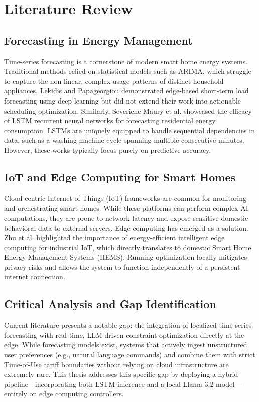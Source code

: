 \documentclass[12pt, a4paper]{article}
\begin{document}
\section{Literature Review}

\subsection{Forecasting in Energy Management}
Time-series forecasting is a cornerstone of modern smart home energy systems. Traditional methods relied on statistical models such as ARIMA, which struggle to capture the non-linear, complex usage patterns of distinct household appliances. Lekidis and Papageorgiou \cite{lekidis2023edge} demonstrated edge-based short-term load forecasting using deep learning but did not extend their work into actionable scheduling optimization. Similarly, Severiche-Maury et al. \cite{severiche2025forecasting} showcased the efficacy of LSTM recurrent neural networks for forecasting residential energy consumption. LSTMs are uniquely equipped to handle sequential dependencies in data, such as a washing machine cycle spanning multiple consecutive minutes. However, these works typically focus purely on predictive accuracy. 

\subsection{IoT and Edge Computing for Smart Homes}
Cloud-centric Internet of Things (IoT) frameworks \cite{zawish2023energy, ali2023iot} are common for monitoring and orchestrating smart homes. While these platforms can perform complex AI computations, they are prone to network latency and expose sensitive domestic behavioral data to external servers. Edge computing has emerged as a solution. Zhu et al. \cite{zhu2022green} highlighted the importance of energy-efficient intelligent edge computing for industrial IoT, which directly translates to domestic Smart Home Energy Management Systems (HEMS). Running optimization locally mitigates privacy risks and allows the system to function independently of a persistent internet connection. 

\subsection{Critical Analysis and Gap Identification}
Current literature presents a notable gap: the integration of localized time-series forecasting with real-time, LLM-driven constraint optimization directly at the edge. While forecasting models exist, systems that actively ingest unstructured user preferences (e.g., natural language commands) and combine them with strict Time-of-Use tariff boundaries without relying on cloud infrastructure are extremely rare. This thesis addresses this specific gap by deploying a hybrid pipeline—incorporating both LSTM inference and a local Llama 3.2 model—entirely on edge computing controllers. 
\end{document}

